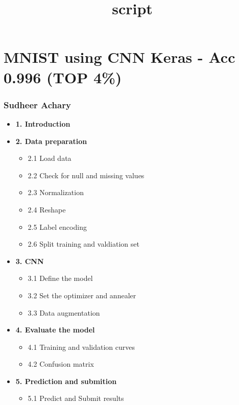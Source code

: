 \documentclass[11pt]{article}
\title{script}
\providecommand{\tightlist}{%
      \setlength{\itemsep}{0pt}\setlength{\parskip}{0pt}}
\begin{document}
    
    
    \maketitle
    
    

    
    \hypertarget{mnist-using-cnn-keras---acc-0.996-top-4}{%
\section{MNIST using CNN Keras - Acc 0.996 (TOP
4\%)}\label{mnist-using-cnn-keras---acc-0.996-top-4}}

\hypertarget{sudheer-achary}{%
\subsubsection{\texorpdfstring{\textbf{Sudheer
Achary}}{Sudheer Achary}}\label{sudheer-achary}}

\begin{itemize}
\tightlist
\item
  \textbf{1. Introduction}
\item
  \textbf{2. Data preparation}

  \begin{itemize}
  \tightlist
  \item
    2.1 Load data
  \item
    2.2 Check for null and missing values
  \item
    2.3 Normalization
  \item
    2.4 Reshape
  \item
    2.5 Label encoding
  \item
    2.6 Split training and valdiation set
  \end{itemize}
\item
  \textbf{3. CNN}

  \begin{itemize}
  \tightlist
  \item
    3.1 Define the model
  \item
    3.2 Set the optimizer and annealer
  \item
    3.3 Data augmentation
  \end{itemize}
\item
  \textbf{4. Evaluate the model}

  \begin{itemize}
  \tightlist
  \item
    4.1 Training and validation curves
  \item
    4.2 Confusion matrix
  \end{itemize}
\item
  \textbf{5. Prediction and submition}

  \begin{itemize}
  \tightlist
  \item
    5.1 Predict and Submit results
  \end{itemize}
\end{itemize}
\end{document}
